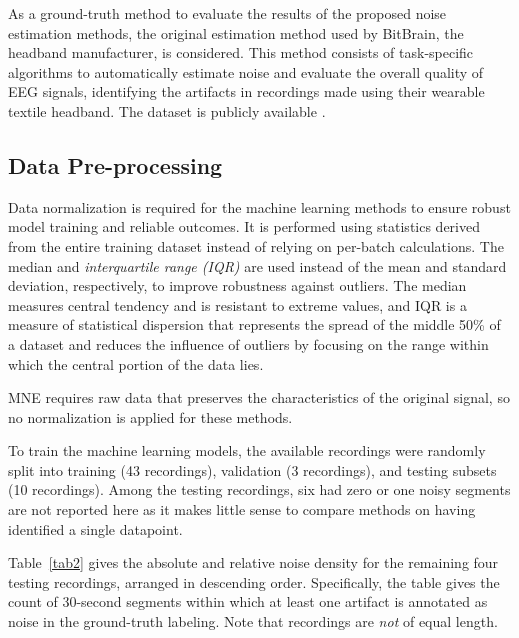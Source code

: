 \documentclass[runningheads]{llncs}
\begin{document}
As a ground-truth method to evaluate the results of the proposed noise
estimation methods, the original estimation method used by
BitBrain, the headband manufacturer, is considered. This method consists of
task-specific algorithms to automatically estimate noise and evaluate
the overall quality of EEG signals, identifying the artifacts in
recordings made using their wearable textile headband.
The dataset is publicly available \cite{boas-dataset}.


\subsection{Data Pre-processing}

Data normalization is required for the machine learning methods to
ensure robust model training and reliable outcomes. It is performed
using statistics derived from the entire training dataset instead of
relying on per-batch calculations. The median and
\emph{interquartile range (IQR)} are used instead of the mean and
standard deviation, respectively, to improve robustness against
outliers. The median measures central tendency and is resistant to
extreme values, and IQR is a measure of statistical dispersion that
represents the spread of the middle 50\% of a dataset and reduces the
influence of outliers by focusing on the range within which the
central portion of the data lies.




MNE requires raw data that preserves the characteristics of the
original signal, so no normalization is applied for these methods.

To train the machine learning models, the available recordings were
randomly split into training (43 recordings), validation (3
recordings), and testing subsets (10 recordings). Among the testing
recordings, six had zero or one noisy segments are not reported here
as it makes little sense to compare methods on having identified a
single datapoint.

Table~\ref{tab2} gives the absolute and relative noise density for the
remaining four testing recordings, arranged in descending order.
Specifically, the table gives the count of 30-second segments within
which at least one artifact is annotated as noise in the ground-truth
labeling. Note that recordings are \emph{not} of equal length.
\end{document}
